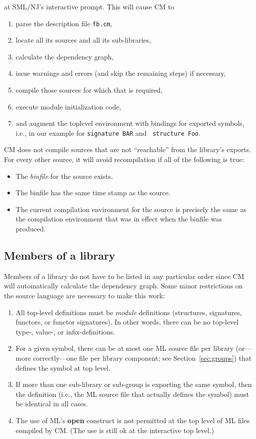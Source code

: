 \documentclass[titlepage,letterpaper]{article}
\begin{document}
at SML/NJ's interactive prompt.  This will cause CM to

\begin{enumerate}
\item parse the description file {\tt fb.cm},
\item locate all its sources and all its sub-libraries,
\item calculate the dependency graph,
\item issue warnings and errors (and skip the remaining steps) if
necessary,
\item compile those sources for which that is required,
\item execute module initialization code,
\item and augment the toplevel environment with bindings for exported
symbols, i.e., in our example for {\tt signature BAR} and {\tt
structure Foo}.
\end{enumerate}

CM does not compile sources that are not ``reachable'' from the
library's exports.  For every other source, it will avoid
recompilation if all of the following is true:

\begin{itemize}
\item The {\em binfile} for the source exists.
\item The binfile has the same time stamp as the source.
\item The current compilation environment for the source is precisely
the same as the compilation environment that was in effect when the
binfile was produced.
\end{itemize}

\subsection{Members of a library}

Members of a library do not have to be listed in any particular order
since CM will automatically calculate the dependency graph.  Some
minor restrictions on the source language are necessary to make this
work:
\begin{enumerate}
\item All top-level definitions must be {\em module} definitions
(structures, signatures, functors, or functor signatures).  In other
words, there can be no top-level type-, value-, or infix-definitions.
\item For a given symbol, there can be at most one ML source file per
library (or---more correctly---one file per library component; see
Section~\ref{sec:groups}) that defines the symbol at top level.
\item If more than one sub-library or sub-group is exporting the same
symbol, then the definition (i.e., the ML source file that actually
defines the symbol) must be identical in all cases.
\label{rule:diamond}
\item The use of ML's {\bf open} construct is not permitted at the top
level of ML files compiled by CM.  (The use is still ok at the
interactive top level.)
\end{enumerate}
\end{document}
